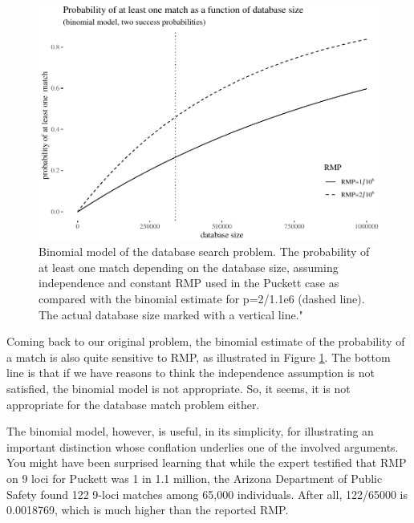 \documentclass[10pt,dvipsnames,enabledeprecatedfontcommands]{scrartcl}
\begin{document}

\begin{figure}[h]

\begin{center}\includegraphics[width=0.8\linewidth]{lr-chapter3_files/figure-latex/fig-puckett-1} \end{center}
\label{fig:puckett}
\caption{Binomial model of the database search problem. The probability of at least one match depending on the database size, assuming independence and constant RMP used in  the Puckett case as compared with the binomial estimate for p=2/1.1e6 (dashed line). The actual database size marked with a vertical line."}
\end{figure}

Coming back to our original problem, the binomial estimate of the
probability of a match is also quite sensitive to RMP, as illustrated in
Figure \ref{fig:puckett}. The bottom line is that if we have reasons to
think the independence assumption is not satisfied, the binomial model
is not appropriate. So, it seems, it is not appropriate for the database
match problem either.

The binomial model, however, is useful, in its simplicity, for
illustrating an important distinction whose conflation underlies one of
the involved arguments. You might have been surprised learning that
while the expert testified that RMP on 9 loci for Puckett was 1 in 1.1
million, the Arizona Department of Public Safety found 122 9-loci
matches among 65,000 individuals. After all, 122/65000 is 0.0018769,
which is much higher than the reported RMP.
\end{document}

